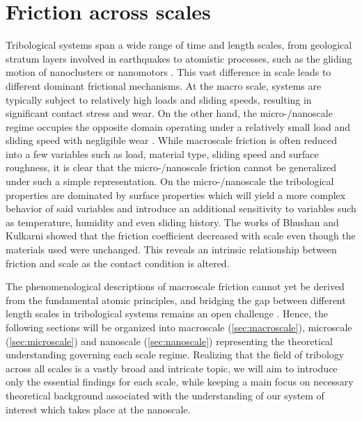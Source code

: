 \section{Friction across scales}
Tribological systems span a wide range of time and length scales, from
geological stratum layers involved in earthquakes \cite{kim_nano-scale_2009} to
atomistic processes, such as the gliding motion of nanoclusters or nanomotors
\cite{Manini_2016}. This vast difference in scale leads to different dominant
frictional mechanisms. At the macro scale, systems are typically subject to
relatively high loads and sliding speeds, resulting in significant contact
stress and wear. On the other hand, the micro-/nanoscale regime occupies the
opposite domain operating under a relatively small load and sliding speed with
negligible wear \cite{kim_nano-scale_2009} \cite[p. 5]{bhushan_2013}. While
macroscale friction is often reduced into a few variables such as load, material
type, sliding speed and surface roughness, it is clear that the micro-/nanoscale
friction cannot be generalized under such a simple representation. On the
micro-/nanoscale the tribological properties are dominated by surface properties
which will yield a more complex behavior of said variables and introduce an
additional sensitivity to variables such as temperature, humidity and even
sliding history. The works of Bhushan and Kulkarni \cite{BHUSHAN199649} showed
that the friction coefficient decreased with scale even though the materials
used were unchanged. This reveals an intrinsic relationship between friction and
scale as the contact condition is altered.


The phenomenological descriptions of macroscale friction cannot yet be derived
from the fundamental atomic principles, and bridging the gap between different
length scales in tribological systems remains an open challenge
\cite{Manini_2016}. Hence, the following sections will be organized into
macroscale (\cref{sec:macroscale}), microscale (\cref{sec:microscale}) and
nanoscale (\cref{sec:nanoscale}) representing the theoretical understanding
governing each scale regime. Realizing that the field of tribology across all
scales is a vastly broad and intricate topic, we will aim to introduce only the
essential findings for each scale, while keeping a main focus on necessary
theoretical background associated with the understanding of our system of interest
which takes place at the nanoscale.






